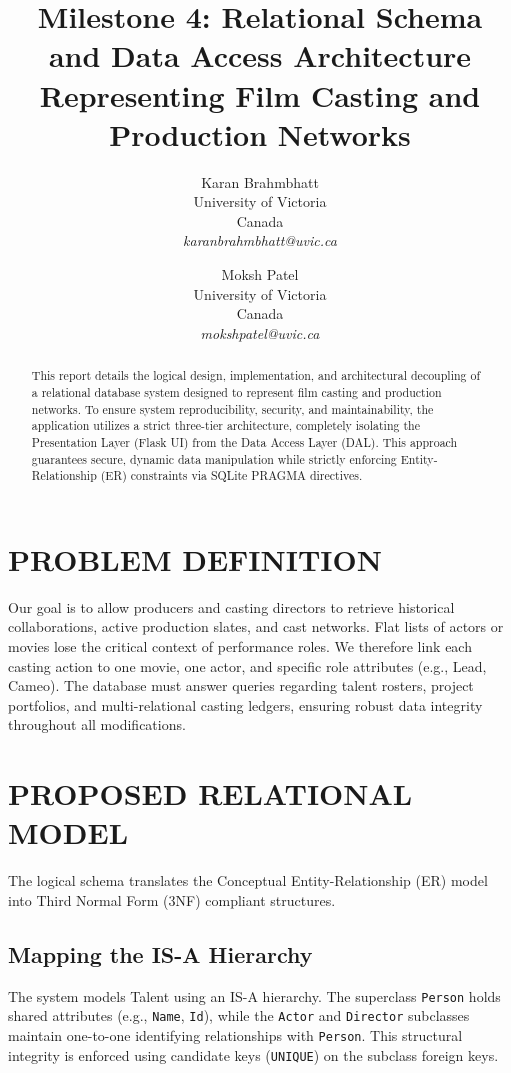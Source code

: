 \documentclass[10pt,twocolumn,letterpaper]{article}
\title{\vspace{-0.4in}\Large\bfseries Milestone 4: Relational Schema and Data Access Architecture\\
\vspace{0.15in}
\huge\bfseries Representing Film Casting and Production Networks}
\author{
    \begin{tabular}{c}
        Karan Brahmbhatt \\
        University of Victoria \\
        Canada \\
        \textit{karanbrahmbhatt@uvic.ca}
    \end{tabular}
    \and 
    \begin{tabular}{c}
        Moksh Patel \\
        University of Victoria \\
        Canada \\
        \textit{mokshpatel@uvic.ca}
    \end{tabular}
}
\date{}
\begin{document}
\maketitle

\begin{abstract}
This report details the logical design, implementation, and architectural decoupling of a relational database system designed to represent film casting and production networks. To ensure system reproducibility, security, and maintainability, the application utilizes a strict three-tier architecture, completely isolating the Presentation Layer (Flask UI) from the Data Access Layer (DAL). This approach guarantees secure, dynamic data manipulation while strictly enforcing Entity-Relationship (ER) constraints via SQLite PRAGMA directives.
\end{abstract}

\section{PROBLEM DEFINITION}
Our goal is to allow producers and casting directors to retrieve historical collaborations, active production slates, and cast networks. Flat lists of actors or movies lose the critical context of performance roles. We therefore link each casting action to one movie, one actor, and specific role attributes (e.g., Lead, Cameo). The database must answer queries regarding talent rosters, project portfolios, and multi-relational casting ledgers, ensuring robust data integrity throughout all modifications.

\section{PROPOSED RELATIONAL MODEL}
The logical schema translates the Conceptual Entity-Relationship (ER) model into Third Normal Form (3NF) compliant structures.

\subsection{Mapping the IS-A Hierarchy}
The system models Talent using an IS-A hierarchy. The superclass \texttt{Person} holds shared attributes (e.g., \texttt{Name}, \texttt{Id}), while the \texttt{Actor} and \texttt{Director} subclasses maintain one-to-one identifying relationships with \texttt{Person}. This structural integrity is enforced using candidate keys (\texttt{UNIQUE}) on the subclass foreign keys. 
\end{document}
